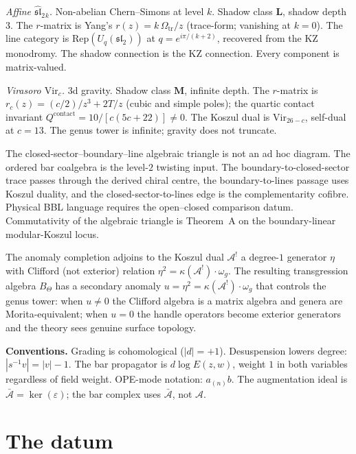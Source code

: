 \documentclass[11pt,reqno]{amsart}
\theoremstyle{definition}
\theoremstyle{remark}
\newcommand{\cA}{\mathcal{A}}
\newcommand{\Vir}{\mathrm{Vir}}
\newcommand{\Rep}{\mathrm{Rep}}
\newcommand{\fsl}{\mathfrak{sl}}
\numberwithin{equation}{section}
\begin{document}
\smallskip
\noindent\emph{Affine $\widehat{\fsl}_2{}_k$.}\enspace
Non-abelian Chern--Simons at level $k$. Shadow class $\mathbf{L}$,
shadow depth $3$. The $r$-matrix is Yang's
$r(z) = k\,\Omega_{\mathrm{tr}}/z$ (trace-form; vanishing at $k=0$). The line
category is $\Rep(U_q(\fsl_2))$ at $q = e^{i\pi/(k+2)}$, recovered
from the KZ monodromy. The shadow connection is the KZ connection.
Every component is matrix-valued.

\smallskip
\noindent\emph{Virasoro $\Vir_c$.}\enspace
3d gravity. Shadow class $\mathbf{M}$, infinite depth. The $r$-matrix
is $r_c(z) = (c/2)/z^3 + 2T/z$ (cubic and simple poles); the quartic
contact invariant $Q^{\mathrm{contact}} = 10/[c(5c+22)] \neq 0$. The
Koszul dual is $\Vir_{26-c}$, self-dual at $c = 13$. The genus tower
is infinite; gravity does not truncate.

\smallskip

The closed-sector--boundary--line algebraic triangle is not an ad hoc
diagram. The ordered bar coalgebra is the level-$2$ twisting input.
The boundary-to-closed-sector trace passes through the derived chiral
centre, the boundary-to-lines passage uses Koszul duality, and the
closed-sector-to-lines edge is the complementarity cofibre. Physical
BBL language requires the open--closed comparison datum. Commutativity
of the algebraic triangle is Theorem~A on the boundary-linear
modular-Koszul locus.

The anomaly completion adjoins to the Koszul dual $\cA^!$ a degree-$1$
generator $\eta$ with Clifford (not exterior) relation
$\eta^2 = \kappa(\cA^!) \cdot \omega_g$. The resulting transgression
algebra $B_\Theta$ has a secondary anomaly
$u = \eta^2 = \kappa(\cA^!) \cdot \omega_g$ that controls the genus
tower: when $u \neq 0$ the Clifford algebra is a matrix algebra and
genera are Morita-equivalent; when $u = 0$ the handle operators become
exterior generators and the theory sees genuine surface topology.

\smallskip
\noindent\textbf{Conventions.}\enspace
Grading is cohomological ($|d| = +1$). Desuspension lowers degree:
$|s^{-1}v| = |v| - 1$. The bar propagator is $d\log E(z,w)$,
weight $1$ in both variables regardless of field weight. OPE-mode
notation: $a_{(n)}b$. The augmentation ideal is
$\bar{\cA} = \ker(\varepsilon)$; the bar complex uses $\bar{\cA}$,
not $\cA$.


\section{The datum}\label{sec:datum}
\end{document}
